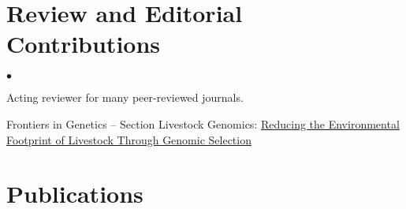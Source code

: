 \documentclass[margin,line]{res}
\newenvironment{list2}{
  \begin{list}{$\bullet$}{%
      \setlength{\itemsep}{0in}
      \setlength{\parsep}{0in} \setlength{\parskip}{0in}
      \setlength{\topsep}{0in} \setlength{\partopsep}{0in}
      \setlength{\leftmargin}{0.2in}}}{\end{list}}
\begin{document}
\begin{resume}
  \section{\sc Review and Editorial Contributions}

  \begin{list2}
    \item Acting reviewer for many peer-reviewed journals.
    \item Frontiers in Genetics -- Section Livestock Genomics: \href{https://www.frontiersin.org/research-topics/24065/reducing-the-environmental-footprint-of-livestock-through-genomic-selection}{Reducing the Environmental Footprint of Livestock Through Genomic Selection}
  \end{list2}
  \section{\sc Publications}


\end{resume}
\end{document}
